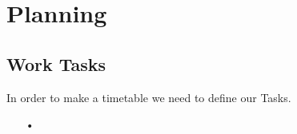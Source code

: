 \section{Planning}

\subsection{Work Tasks}
In order to make a timetable we need to define our Tasks.
\begin{itemize}
\item[•]
\end{itemize}